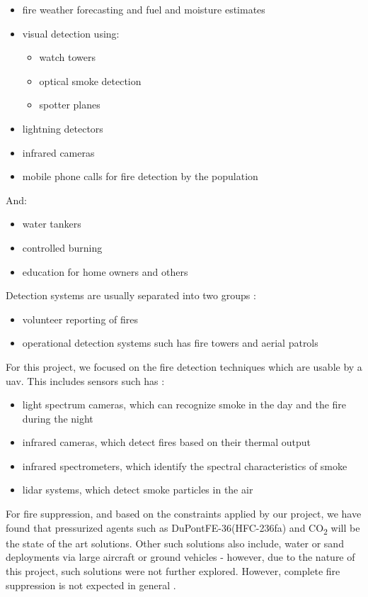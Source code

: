 \documentclass[runningheads]{llncs}
\begin{document}
\begin{itemize}
	\item fire weather forecasting and fuel and moisture estimates
	\item visual detection using:
	\begin{itemize}
		\item watch towers
		\item optical smoke detection
		\item spotter planes
	\end{itemize}
	\item lightning detectors
	\item infrared cameras
	\item mobile phone calls for fire detection by the population
\end{itemize}

And:

\begin{itemize}
	\item water tankers
	\item controlled burning
	\item education for home owners and others
\end{itemize}

Detection systems are usually separated into two groups \cite{do8}:

\begin{itemize}
	\item volunteer reporting of fires
	\item operational detection systems such has fire towers and aerial patrols
\end{itemize}

For this project, we focused on the fire detection techniques which are usable by a \acrshort{uav}. This includes sensors such has \cite{NationalSlovakia}:

\begin{itemize}
	\item light spectrum cameras, which can recognize smoke in the day and the fire during the night
	\item infrared cameras, which detect fires based on their thermal output
	\item infrared spectrometers, which identify the spectral characteristics of smoke
	\item \acrfull{lidar} systems, which detect smoke particles in the air
\end{itemize}

For fire suppression, and based on the constraints applied by our project, we have found that pressurized agents such as DuPont\texttrademark \space FE-36\texttrademark (HFC-236fa) \cite{DuPontFluoroproducts} and CO\textsubscript{2} will be the state of the art solutions. Other such solutions also include, water or sand deployments via large aircraft or ground vehicles - however, due to the nature of this project, such solutions were not further explored. However, complete fire suppression is not expected in general \cite{Knowling_2016}.
\end{document}
